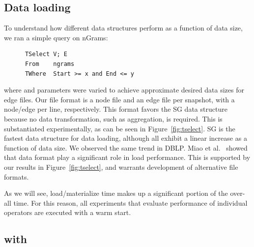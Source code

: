 \subsection{Data loading}

To understand how different data structures perform as a function of
data size, we ran a simple  query on nGrams:

\begin{small}
\begin{verbatim}
      TSelect V; E
      From    ngrams
      TWhere  Start >= x and End <= y
\end{verbatim}
\end{small}

\noindent where  and  parameters were varied to
achieve approximate desired data sizes for edge files.  Our file
format is a node file and an edge file per snapshot, with a node/edge
per line, respectively.  This format favors the SG data structure
because no data transformation, such as aggregation, is required.
This is substantiated experimentally, as can be seen in
Figure~\ref{fig:tselect}.  SG is the fastest data structure for data
loading, although all exhibit a linear increase as a function of data
size.  We observed the same trend in DBLP.  Miao et
al.~\cite{DBLP:journals/tos/MiaoHLWYZPCC15} showed that data format
play a significant role in load performance.  This is supported by our
results in Figure~\ref{fig:tselect}, and warrants development of
alternative file formats.

As we will see, load/materialize time makes up a significant portion
of the over-all time.  For this reason, all experiments that evaluate
performance of individual \ql operators are executed with a warm
start.



\subsection{ with }
\label{sec:exp:tgroup}

